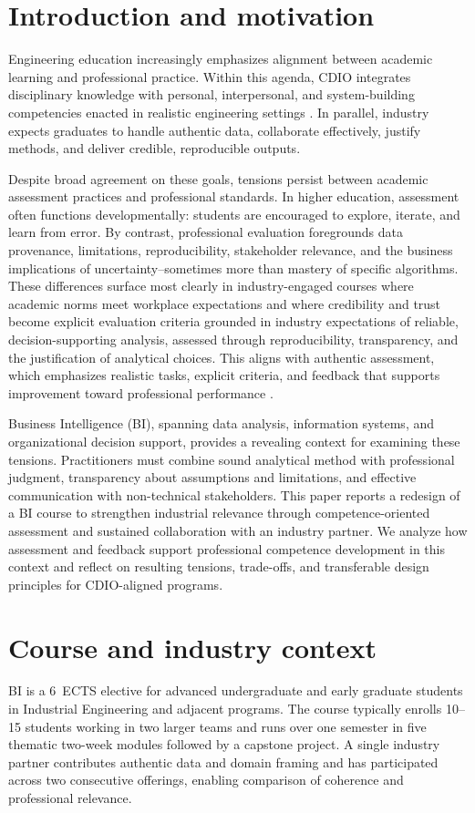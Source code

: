 \section{Introduction and motivation}
Engineering education increasingly emphasizes alignment between academic learning and professional practice. Within this agenda, CDIO integrates disciplinary knowledge with personal, interpersonal, and system-building competencies enacted in realistic engineering settings \parencite{CDIOSyllabus3}.
In parallel, industry expects graduates to handle authentic data, collaborate effectively, justify methods, and deliver credible, reproducible outputs.

Despite broad agreement on these goals, tensions persist between academic assessment practices and professional standards. In higher education, assessment often functions developmentally: students are encouraged to explore, iterate, and learn from error. By contrast, professional evaluation foregrounds data provenance, limitations, reproducibility, stakeholder relevance, and the business implications of uncertainty--sometimes more than mastery of specific algorithms. These differences surface most clearly in industry-engaged courses where academic norms meet workplace expectations and 
where credibility and trust become explicit evaluation criteria grounded in industry expectations of reliable, decision-supporting analysis, assessed through reproducibility, transparency, and the justification of analytical choices. This aligns with authentic assessment, which emphasizes realistic tasks, explicit criteria, and feedback that supports improvement toward professional performance \parencite{wiggins1998educative}.

Business Intelligence (BI), spanning data analysis, information systems, and organizational decision support, provides a revealing context for examining these tensions. Practitioners must combine sound analytical method with professional judgment, transparency about assumptions and limitations, and effective communication with non-technical stakeholders. This paper reports a redesign of a BI course to strengthen industrial relevance through competence-oriented assessment and sustained collaboration with an industry partner. We analyze how assessment and feedback support professional competence development in this context and reflect on resulting tensions, trade-offs, and transferable design principles for CDIO-aligned programs.

\section{Course and industry context}
BI is a 6~ECTS elective for advanced undergraduate and early graduate students in Industrial Engineering and adjacent programs. The course typically enrolls 10--15 students working in two larger teams and runs over one semester in five thematic two-week modules followed by a capstone project.
%
A single industry partner contributes authentic data and domain framing and has participated across two consecutive offerings, enabling comparison of coherence and professional relevance. 


